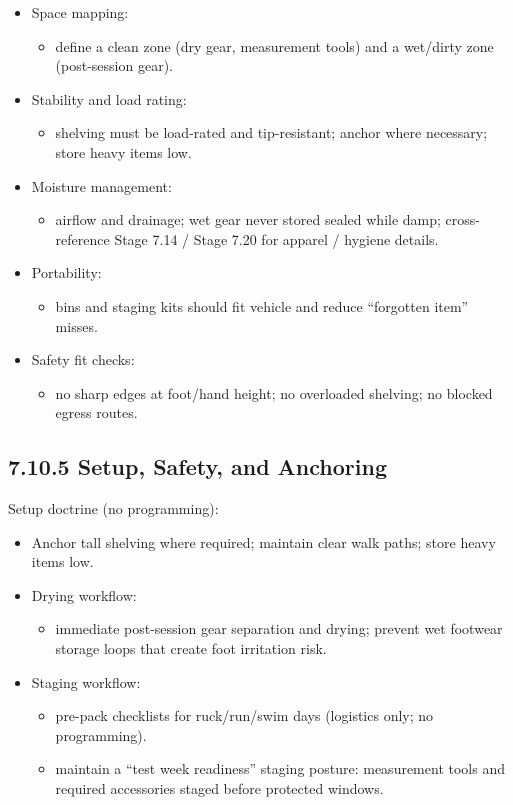 \documentclass[10pt]{article}
\begin{document}
\begin{itemize}
\item Space mapping:
  \begin{itemize}
  \item define a clean zone (dry gear, measurement tools) and a wet/dirty zone (post-session gear).
  \end{itemize}
\item Stability and load rating:
  \begin{itemize}
  \item shelving must be load-rated and tip-resistant; anchor where necessary; store heavy items low.
  \end{itemize}
\item Moisture management:
  \begin{itemize}
  \item airflow and drainage; wet gear never stored sealed while damp; cross-reference Stage 7.14 / Stage 7.20 for apparel / hygiene details.
  \end{itemize}
\item Portability:
  \begin{itemize}
  \item bins and staging kits should fit vehicle and reduce “forgotten item” misses.
  \end{itemize}
\item Safety fit checks:
  \begin{itemize}
  \item no sharp edges at foot/hand height; no overloaded shelving; no blocked egress routes.
  \end{itemize}
\end{itemize}

\subsection*{7.10.5 Setup, Safety, and Anchoring}
{}

Setup doctrine (no programming):

\begin{itemize}
\item Anchor tall shelving where required; maintain clear walk paths; store heavy items low.
\item Drying workflow:
  \begin{itemize}
  \item immediate post-session gear separation and drying; prevent wet footwear storage loops that create foot irritation risk.
  \end{itemize}
\item Staging workflow:
  \begin{itemize}
  \item pre-pack checklists for ruck/run/swim days (logistics only; no programming).
  \item maintain a “test week readiness” staging posture: measurement tools and required accessories staged before protected windows.
  \end{itemize}
\end{itemize}
\end{document}
